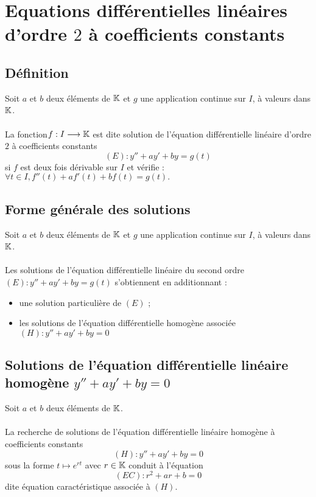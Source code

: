 \section{Equations différentielles linéaires d’ordre \(2\) à coefficients constants}
\subsection{Définition}
\begin{defi}
    Soit \(a\) et \(b\) deux éléments de \(\mathbb{K}\) et \(g\) une application continue sur \(I\), à valeurs dans \(\mathbb{K}\).\\~\\
    La fonction\( f : I \longrightarrow \mathbb{K}\) est dite solution de l’équation différentielle linéaire d’ordre \(2\) à coefficients constants
    \[(E) : y''+ ay' + by = g(t)\]
    si \(f\) est deux fois dérivable sur \(I\) et vérifie :
    \(\forall t \in I, f''(t) + af'(t) + bf (t) = g(t).\)
\end{defi}

\subsection{Forme générale des solutions}
\begin{defprop}
    Soit \(a\) et \(b\) deux éléments de \(\mathbb{K}\) et \(g\) une application continue sur \(I\), à valeurs dans \(\mathbb{K}\).\\~\\
    Les solutions de l’équation différentielle linéaire du second ordre\( (E) : y'' + ay' + by = g(t)\) s’obtiennent en additionnant :
    \begin{itemize}
        \item une solution particulière de \((E)\) ;
        \item les solutions de l’équation différentielle homogène associée \((H) : y'' + ay' + by = 0\)
    \end{itemize}
    
\end{defprop}



\subsection{Solutions de l’équation différentielle linéaire homogène \(y'' + ay' + by = 0\)}

\begin{defprop}
    Soit \(a\) et \(b\) deux éléments de \(\mathbb{K}\).\\~\\
    La recherche de solutions de l’équation différentielle linéaire homogène à coefficients constants
    \[(H) : y'' + ay' + by = 0\]
    sous la forme \(t \mapsto e^{rt}\) avec \(r \in \mathbb{K}\) conduit à l’équation
    \[(EC) : r^2 + ar + b = 0\]
    dite équation caractéristique associée à \((H)\).
\end{defprop}

